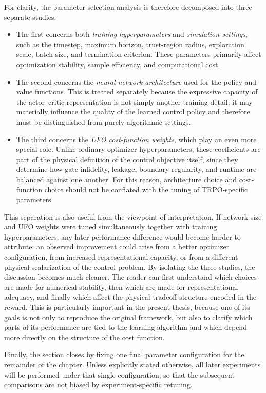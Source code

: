 For clarity, the parameter-selection analysis is therefore decomposed into three separate studies. 
\begin{itemize}
    \item The first concerns both \emph{training hyperparameters} and \emph{simulation settings}, such as the timestep, maximum horizon, trust-region radius, exploration scale, batch size, and termination criterion. These parameters primarily affect optimization stability, sample efficiency, and computational cost. 
    \item The second concerns the \emph{neural-network architecture} used for the policy and value functions. This is treated separately because the expressive capacity of the actor--critic representation is not simply another training detail: it may materially influence the quality of the learned control policy and therefore must be distinguished from purely algorithmic settings. 
    \item The third concerns the \emph{UFO cost-function weights}, which play an even more special role. Unlike ordinary optimizer hyperparameters, these coefficients are part of the physical definition of the control objective itself, since they determine how gate infidelity, leakage, boundary regularity, and runtime are balanced against one another. For this reason, architecture choice and cost-function choice should not be conflated with the tuning of TRPO-specific parameters.
\end{itemize}

This separation is also useful from the viewpoint of interpretation. If network size and UFO weights were tuned simultaneously together with training hyperparameters, any later performance difference would become harder to attribute: an observed improvement could arise from a better optimizer configuration, from increased representational capacity, or from a different physical scalarization of the control problem. By isolating the three studies, the discussion becomes much cleaner. The reader can first understand which choices are made for numerical stability, then which are made for representational adequacy, and finally which affect the physical tradeoff structure encoded in the reward. This is particularly important in the present thesis, because one of its goals is not only to reproduce the original framework, but also to clarify which parts of its performance are tied to the learning algorithm and which depend more directly on the structure of the cost function.

Finally, the section closes by fixing one final parameter configuration for the remainder of the chapter. Unless explicitly stated otherwise, all later experiments will be performed under that single configuration, so that the subsequent comparisons are not biased by experiment-specific retuning.

